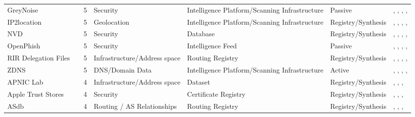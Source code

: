 \begin{table}[h!]
\begin{tabular}{lllllll}
GreyNoise & \cite{greynoise_data} & 5 & Security & Intelligence Platform/Scanning Infrastructure & Passive & \cite{10.1145/3646547.3689012}, \cite{10.1145/3618257.3624818}, \cite{10.1145/3487552.3487833}, \cite{10.1145/3487552.3487840}, \cite{10.1145/3777912.3839790} \\
IP2location & \cite{ip2location} & 5 & Geolocation & Intelligence Platform/Scanning Infrastructure & Registry/Synthesis & \cite{10.1145/3517745.3561423}, \cite{10.1007/978-3-030-98785-5_6}, \cite{10.1007/978-3-031-56252-5_1}, \cite{10.1007/978-3-032-18268-5_9}, \cite{10.1145/3777912.3809136} \\
NVD & \cite{nvd-nist} & 5 & Security & Database & Registry/Synthesis & \cite{10.1145/3618257.3624804}, \cite{10.1145/3618257.3624810}, \cite{10.1145/3487552.3487833}, \cite{10.1007/978-3-030-72582-2_5}, \cite{10.1007/978-3-030-98785-5_30} \\
OpenPhish & \cite{openphish} & 5 & Security & Intelligence Feed & Passive & \cite{10.1145/3517745.3561467}, \cite{10.1007/978-3-031-28486-1_20}, \cite{10.1007/978-3-031-28486-1_24}, \cite{10.1007/978-3-031-28486-1_26}, \cite{10.1007/978-3-031-56249-5_9} \\
RIR Delegation Files & \cite{rir-delegation-files} & 5 & Infrastructure/Address space & Routing Registry & Registry/Synthesis & \cite{10.1145/3730567.3764449}, \cite{10.1145/3487552.3487825}, \cite{10.1007/978-3-030-98785-5_29}, \cite{10.1145/3777912.3839831}, \cite{10.1145/3777912.3809155} \\
ZDNS & \cite{zdns} & 5 & DNS/Domain Data & Intelligence Platform/Scanning Infrastructure & Active & \cite{10.1145/3646547.3688449}, \cite{10.1007/978-3-031-56249-5_5}, \cite{10.1007/978-3-031-85960-1_3}, \cite{10.1145/3777912.3839830}, \cite{10.1145/3777912.3839828} \\
APNIC Lab & \cite{apnic_customers} & 4 & Infrastructure/Address space & Dataset & Registry/Synthesis & \cite{10.1145/3646547.3688411}, \cite{10.1145/3777912.3809137}, \cite{10.1145/3777912.3839801}, \cite{10.1145/3777912.3809144} \\
Apple Trust Stores & \cite{apple_trust_store} & 4 & Security & Certificate Registry & Registry/Synthesis & \cite{10.1145/3618257.3624815}, \cite{10.1145/3646547.3688415}, \cite{10.1007/978-3-030-72582-2_11}, \cite{10.1007/978-3-031-28486-1_4} \\
ASdb & \cite{10.1145/3487552.3487853} & 4 & Routing / AS Relationships & Routing Registry & Registry/Synthesis & \cite{10.1145/3730567.3764481}, \cite{10.1145/3730567.3732917}, \cite{10.1145/3618257.3624811}, \cite{10.1145/3777912.3809155} \\

\end{tabular}
\end{table}
